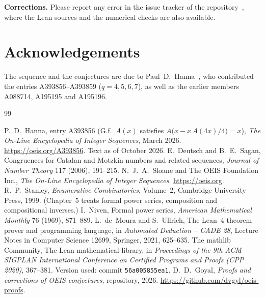 \documentclass[11pt,a4paper]{article}
\theoremstyle{definition}
\theoremstyle{remark}
\newcommand{\para}[1]{\par\medskip\noindent\textbf{#1}\enspace}
\begin{document}
\para{Corrections.} Please report any error in the issue tracker of the repository~\cite{repo}, where the Lean sources and the numerical checks are also
available.

\section*{Acknowledgements}
The sequence and the conjectures are due to Paul~D.~Hanna~\cite{oeis}, who contributed
the entries A393856--A393859 ($q=4,5,6,7$), as well as the earlier members A088714, A195195 and A195196.

\begin{thebibliography}{99}\small
\raggedright
{} P.~D.~Hanna, entry A393856 (G.f.\ $A(x)$ satisfies $A\bigl(x-x\,A(4x)/4\bigr)=x$), \emph{The On-Line Encyclopedia of Integer Sequences}, March 2026. \url{https://oeis.org/A393856}. Text as of October 2026.
 E.~Deutsch and B.~E.~Sagan, Congruences for Catalan and Motzkin numbers and related sequences, \emph{Journal of Number Theory} 117 (2006), 191--215.
 N.~J.~A.~Sloane and The OEIS Foundation Inc., \emph{The On-Line Encyclopedia of Integer Sequences}. \url{https://oeis.org}.
 R.~P.~Stanley, \emph{Enumerative Combinatorics}, Volume~2, Cambridge University Press, 1999. (Chapter~5 treats formal power series, composition and compositional inverses.)
 I.~Niven, Formal power series, \emph{American Mathematical Monthly} 76 (1969), 871--889.
 L.~de~Moura and S.~Ullrich, The Lean~4 theorem prover and programming language, in \emph{Automated Deduction -- CADE 28}, Lecture Notes in Computer Science 12699, Springer, 2021, 625--635.
 The mathlib Community, The Lean mathematical library, in \emph{Proceedings of the 9th ACM SIGPLAN International Conference on Certified Programs and Proofs (CPP 2020)}, 367--381. Version used: commit \texttt{56a005855ea1}.
 D.~D.~Goyal, \emph{Proofs and corrections of OEIS conjectures}, repository, 2026. \url{https://github.com/dvgyl/oeis-proofs}.
\end{thebibliography}
\end{document}
